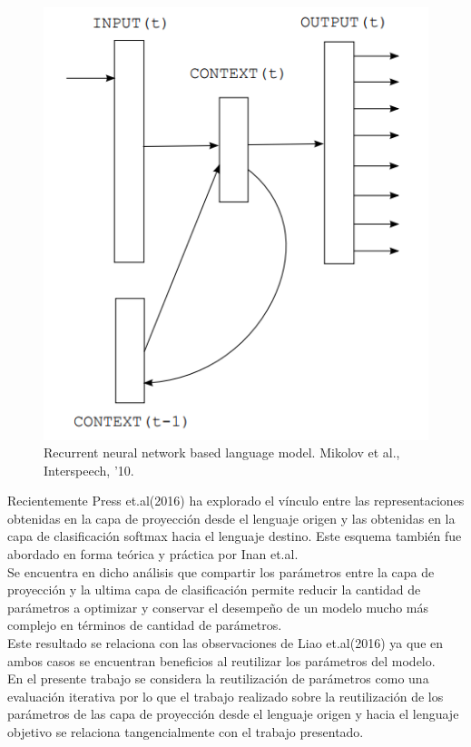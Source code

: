 \documentclass{article}
\begin{document}
	\begin{figure}[H]
		\centering
		\includegraphics[scale=0.5]{RNNLanguageModel.png}
		\caption{Recurrent neural network based language model. Mikolov et al., Interspeech, ’10.}
		\label{RNNLanguageModel}
	\end{figure}
	
	Recientemente Press et.al(2016)\cite{53SharingInputAndOutputEmbeddings} ha explorado el vínculo entre las representaciones obtenidas en la capa de proyección desde el lenguaje origen y las obtenidas en la capa de clasificación softmax hacia el lenguaje destino. Este esquema también fue abordado en forma teórica y práctica por Inan et.al\cite{63WordEmbeddingTyingTheory}.\\
	Se encuentra en dicho análisis que compartir los parámetros entre la capa de proyección y la ultima capa de clasificación permite reducir la cantidad de parámetros a optimizar y conservar el desempeño de un modelo mucho más complejo en términos de cantidad de parámetros.\\
	Este resultado se relaciona con las observaciones de Liao et.al(2016)\cite{2BridgingGaps} ya que en ambos casos se encuentran beneficios al reutilizar los parámetros del modelo.\\
	En el presente trabajo se considera la reutilización de parámetros como una evaluación iterativa por lo que el trabajo realizado sobre la reutilización de los parámetros de las capa de proyección desde el lenguaje origen y hacia el lenguaje objetivo se relaciona tangencialmente con el trabajo presentado.
	
\end{document}

